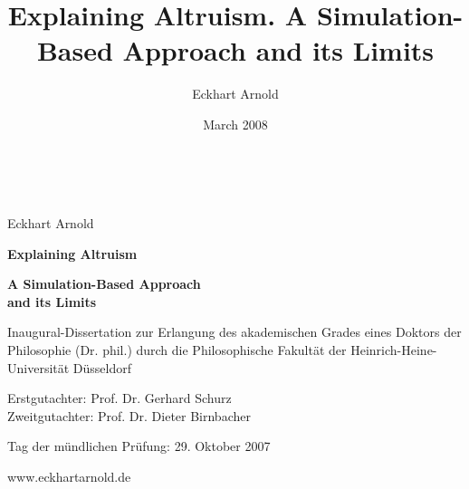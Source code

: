 \title{Explaining Altruism. A Simulation-Based Approach and its
Limits}

\author{Eckhart Arnold}
\date{March 2008}


\begin{titlepage}

\setlength{\parindent}{0em}
\begin{flushleft} 

\ {  }

\vspace{4cm}
\begin{center}
{\Large Eckhart Arnold}

\setlength{\parskip}{2cm}
{\huge\bf Explaining Altruism}

\setlength{\parskip}{0.3cm}
{\huge\bf A Simulation-Based Approach\\and its Limits}
\end{center}

\setlength{\parskip}{3cm}
\begin{center}{\Large Inaugural-Dissertation zur Erlangung des akademischen Grades 
eines Doktors der Philosophie (Dr. phil.) durch die
Philosophische Fakultät der Heinrich-Heine-Universität Düsseldorf}\end{center}
 
\setlength{\parskip}{2cm}
{\Large Erstgutachter: Prof. Dr. Gerhard Schurz \\
Zweitgutachter: Prof. Dr. Dieter Birnbacher}

\setlength{\parskip}{0.5cm}
{\Large Tag der mündlichen Prüfung: 29. Oktober 2007}
\end{flushleft} 

\begin{center} 
\setlength{\parskip}{3cm}
{\footnotesize www.eckhartarnold.de} 
\end{center}


\end{titlepage}